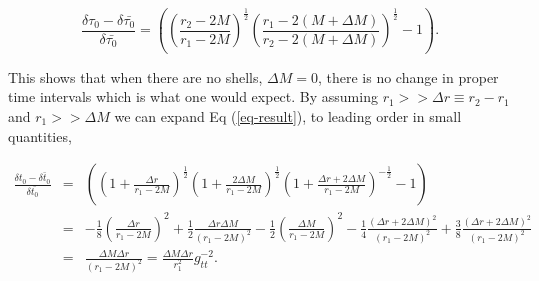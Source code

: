 \documentclass[aps,showpacs,onecolumn,floats,prd,superscriptaddress,nofootinbib]{revtex4-1}
\begin{document}
\begin{equation}
	 \frac{\delta \tau_0 - \delta \bar{\tau_0}}{\delta \bar{\tau_0}} = \left( \left( \frac{r_2 - 2M}{r_1 - 2M} \right)^\frac{1}{2} \left( \frac{r_1 - 2(M+\Delta M)}{r_2 - 2(M+\Delta M)} \right)^\frac{1}{2} - 1\right).	\label{10}
\end{equation}

This shows that when there are no shells, $\Delta M = 0$, there is no change in proper time intervals which is what one would expect. By assuming $r_1>> \Delta r \equiv r_2 - r_1$ and $r_1>> \Delta M$ we can expand Eq (\ref{eq-result}), to leading order in small quantities,

\begin{eqnarray}
	\frac{\delta t_0 - \bar{\delta t_0}}{\delta \bar{t_0}} & = & 
	\left( \left( 1+ \frac{\Delta r}{r_1 - 2M} \right)^\frac{1}{2} \left( 1 + \frac{2\Delta M}{r_1 - 2M} \right)^\frac{1}{2} \left( 1 + \frac{\Delta r + 2 \Delta M}{r_1 - 2M} \right)^{-\frac{1}{2}} - 1 \right)	\nonumber	\\
	& = & - \frac{1}{8} \left( \frac{\Delta r}{r_1 - 2M} \right)^2 + 
	\frac{1}{2} \frac{\Delta r \Delta M}{(r_1 - 2M)^2} - 
	\frac{1}{2} \left( \frac{\Delta M}{r_1 - 2M} \right)^2 - 
	\frac{1}{4} \frac{( \Delta r + 2 \Delta M)^2}{(r_1 - 2M)^2} + 
	\frac{3}{8} \frac{(\Delta r+ 2 \Delta M)^2}{(r_1 - 2M)^2} 	\nonumber	\\
	& = & \frac{\Delta M \Delta r}{(r_1 - 2M)^2} = \frac{\Delta M \Delta r}{r_1^2} g_{tt}^{-2}.
\end{eqnarray}
	
%
%
\end{document}
